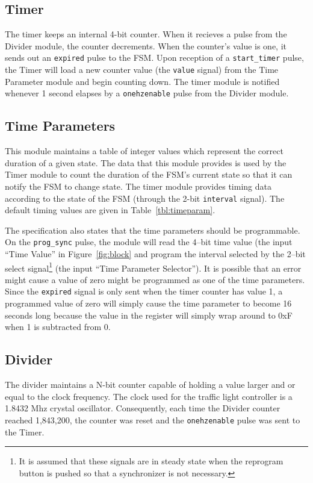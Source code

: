 \documentclass{article}
\begin{document}
	\subsection{Timer}
		The timer keeps an internal 4-bit counter.  When it recieves a
		pulse from the Divider module, the counter decrements.  When
		the counter's value is one, it sends out an {\texttt{expired}}
		pulse to the FSM.  Upon reception of a {\texttt{start\_timer}}
		pulse, the Timer will load a new counter value (the \texttt{value}
		signal) from the Time Parameter module and begin counting down.  The
		timer module is notified whenever 1 second elapses by a
		\texttt{onehzenable} pulse from the Divider module.

	\subsection{Time Parameters}
		This module maintains a table of integer values which represent
		the correct duration of a given state.  The data that this module
		provides is used by the Timer module to count the duration of the FSM's
		current state so that it can notify the FSM to change state.  The timer
		module provides timing data according to the state of the FSM (through
		the 2-bit \texttt{interval} signal).  The default timing values are
		given in Table~\ref{tbl:timeparam}.

		The specification also states that the time parameters should be
		programmable.  On the \texttt{prog\_sync} pulse, the module will read
		the 4--bit time value (the input ``Time Value'' in
		Figure~\ref{fig:block} and program the interval selected by the 2--bit
		select signal\footnote{It is assumed that these signals are in steady
		state when the reprogram button is pushed so that a synchronizer is not
		necessary.} (the input ``Time Parameter Selector'').  It is possible
		that an error might cause a value of zero might be programmed as one of
		the time parameters.  Since the \texttt{expired} signal is only sent
		when the timer counter has value 1, a programmed value of zero will
		simply cause the time parameter to become 16 seconds long because the
		value in the register will simply wrap around to 0xF when 1 is
		subtracted from 0.

	\subsection{Divider}
		The divider maintains a N-bit counter capable of holding a
		value larger and or equal to the clock frequency.  The clock
		used for the traffic light controller is a 1.8432 Mhz crystal
		oscillator.  Consequently, each time the Divider counter
		reached 1,843,200, the counter was reset and the \texttt{onehzenable}
		pulse was sent to the Timer.
\end{document}

